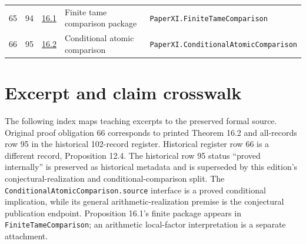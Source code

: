 \documentclass[10pt,oneside]{book}
\begin{document}
\begin{longtable}{@{}p{}p{}p{}>{\raggedright\arraybackslash}p{}p{}@{}}
65&94&\href{https://komorebi.invalid/b07/obligation_65}{16.1}&Finite tame comparison package&\nolinkurl{PaperXI.FiniteTameComparison}\\

66&95&\href{https://komorebi.invalid/b07/obligation_66}{16.2}&Conditional atomic comparison&\nolinkurl{PaperXI.ConditionalAtomicComparison}\\

\bottomrule\end{longtable}

\chapter{Excerpt and claim crosswalk}

The following index maps teaching excerpts to the preserved formal source. Original proof obligation 66 corresponds to printed Theorem 16.2 and all-records row 95 in the historical 102-record register. Historical register row 66 is a different record, Proposition 12.4. The historical row 95 status ``proved internally'' is preserved as historical metadata and is superseded by this edition's conjectural-realization and conditional-comparison split. The \texttt{ConditionalAtomicComparison.source} interface is a proved conditional implication, while its general arithmetic-realization premise is the conjectural publication endpoint. Proposition 16.1's finite package appears in \texttt{FiniteTameComparison}; an arithmetic local-factor interpretation is a separate attachment.
\end{document}
